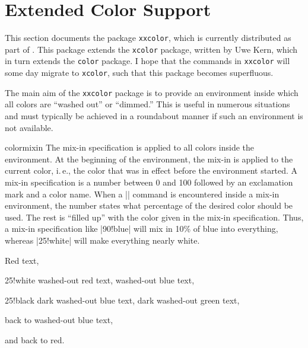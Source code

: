%
%
%


\section{Extended Color Support}

This section documents the package \texttt{xxcolor}, which is
currently distributed as part of \pgfname. This package extends the
\texttt{xcolor} package, written by Uwe Kern, which in turn extends
the \texttt{color} package. I hope that the commands in
\texttt{xxcolor} will some day migrate to \texttt{xcolor}, such that
this package becomes superfluous.

The main aim of the \texttt{xxcolor} package is to provide an
environment inside which all colors are ``washed out'' or ``dimmed.''
This is useful in numerous situations and must typically be achieved
in a roundabout manner if such an environment is not available.

\begin{environment}{{colormixin}}
  The mix-in specification is applied to all colors inside
  the environment. At the beginning of the environment, the mix-in is
  applied to the current color, i.\,e., the color that was in effect
  before the environment started. A mix-in specification is a number
  between 0 and 100 followed by an exclamation mark and a color
  name. When a |\color| command is
  encountered inside a mix-in environment, the number states what
  percentage of the desired color should be used. The rest is
  ``filled up'' with the color given in the mix-in
  specification. Thus, a mix-in specification like |90!blue|
  will mix in 10\% of blue into everything, whereas |25!white| will
  make everything nearly white.

\begin{codeexample}[width=4cm]
\begin{minipage}{3.5cm}\raggedright
\color{red}Red text,%
\begin{colormixin}{25!white}
  washed-out red text,
  \color{blue} washed-out blue text,
  \begin{colormixin}{25!black}
    dark washed-out blue text,
    \color{green} dark washed-out green text,%
  \end{colormixin}
  back to washed-out blue text,%
\end{colormixin}
and back to red.
\end{minipage}%
\end{codeexample}
\end{environment}

